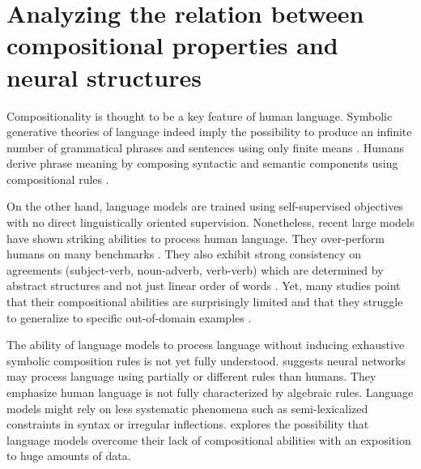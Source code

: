 \setchapterpreamble[u]{\margintoc}
\chapter{Analyzing the relation between compositional properties and neural structures}


Compositionality is thought to be a key feature of human language. Symbolic generative theories of language indeed imply the possibility to produce an infinite number of grammatical phrases and sentences using only finite means . Humans derive phrase meaning by composing syntactic and semantic components using compositional rules \parencite{partee_84, cann_93, dowty_07}. %

On the other hand, language models are trained using self-supervised objectives with no direct linguistically oriented supervision. Nonetheless, recent large  models have shown striking abilities to process human language. They over-perform humans on many benchmarks \parencite{devlin_19, brown_20}. They also exhibit strong consistency on agreements (subject-verb, noun-adverb, verb-verb) which are determined by abstract structures and not just linear order of words \parencite{linzen_16, gulordava_18, marvin_18, newman_21}. Yet, many studies point that their compositional abilities are surprisingly limited and that they struggle to generalize to specific out-of-domain examples \parencite{lake_18, kim_20, hupkes_20}. 

The ability of language models to process language without inducing exhaustive symbolic composition rules is not yet fully understood. \textcite{baroni_19} suggests neural networks may process language using partially or different rules than humans. They emphasize human language is not fully characterized by algebraic rules. Language models might rely on less systematic phenomena such as semi-lexicalized constraints in syntax or irregular inflections.  explores the possibility that language models overcome their lack of compositional abilities with an exposition to huge amounts of data.

